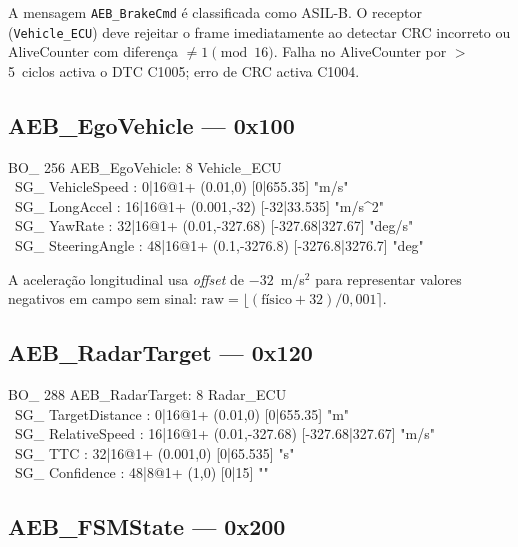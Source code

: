 \documentclass[12pt,a4paper]{article}
\begin{document}
\begin{tcolorbox}[atencaobox]
  A mensagem \texttt{AEB\_BrakeCmd} é classificada como ASIL-B.
  O receptor (\texttt{Vehicle\_ECU}) deve rejeitar o frame imediatamente
  ao detectar CRC incorreto ou AliveCounter com diferença $\neq 1 \pmod{16}$.
  Falha no AliveCounter por $>$5~ciclos activa o DTC C1005; erro de CRC
  activa C1004.
\end{tcolorbox}

\subsection{AEB\_EgoVehicle --- 0x100}

\begin{tcolorbox}[dbc]
BO\_ 256 AEB\_EgoVehicle: 8 Vehicle\_ECU\\
\ SG\_ VehicleSpeed   : 0|16@1+  (0.01,0)       [0|655.35]     "m/s"\\
\ SG\_ LongAccel      : 16|16@1+ (0.001,-32)    [-32|33.535]   "m/s\textasciicircum{}2"\\
\ SG\_ YawRate        : 32|16@1+ (0.01,-327.68) [-327.68|327.67] "deg/s"\\
\ SG\_ SteeringAngle  : 48|16@1+ (0.1,-3276.8)  [-3276.8|3276.7] "deg"
\end{tcolorbox}

A aceleração longitudinal usa \textit{offset} de $-32$~m/s$^2$ para
representar valores negativos em campo sem sinal:
$\text{raw} = \lfloor(\text{físico} + 32) / 0{,}001\rceil$.

\subsection{AEB\_RadarTarget --- 0x120}

\begin{tcolorbox}[dbc]
BO\_ 288 AEB\_RadarTarget: 8 Radar\_ECU\\
\ SG\_ TargetDistance : 0|16@1+  (0.01,0)      [0|655.35]     "m"\\
\ SG\_ RelativeSpeed  : 16|16@1+ (0.01,-327.68) [-327.68|327.67] "m/s"\\
\ SG\_ TTC            : 32|16@1+ (0.001,0)     [0|65.535]     "s"\\
\ SG\_ Confidence     : 48|8@1+  (1,0)         [0|15]         ""
\end{tcolorbox}

\subsection{AEB\_FSMState --- 0x200}
\end{document}
